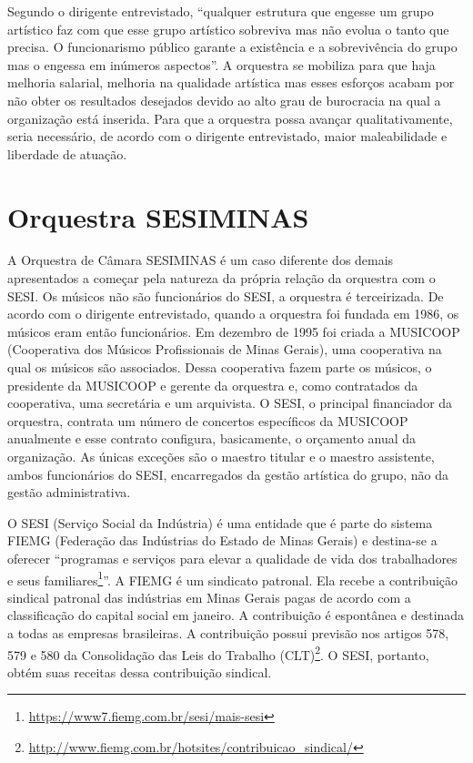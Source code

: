 \documentclass[a4paper, 12pt, openright, oneside, german, french, english, brazil]{abntex2}
\begin{document}
	Segundo o dirigente entrevistado, ``qualquer estrutura que engesse um grupo artístico faz com que esse grupo artístico sobreviva mas não evolua o tanto que precisa. O funcionarismo público garante a existência e a sobrevivência do grupo mas o engessa em inúmeros aspectos''. A orquestra se mobiliza para que haja melhoria salarial, melhoria na qualidade artística mas esses esforços acabam por não obter os resultados desejados devido ao alto grau de burocracia na qual a organização está inserida. Para que a orquestra possa avançar qualitativamente, seria necessário, de acordo com o dirigente entrevistado, maior maleabilidade e liberdade de atuação.
	
	
	
	
	
	\chapter{Orquestra SESIMINAS}
	
	A Orquestra de Câmara SESIMINAS é um caso diferente dos demais apresentados a começar pela natureza da própria relação da orquestra com o SESI. Os músicos não são funcionários do SESI, a orquestra é terceirizada. De acordo com o dirigente entrevistado, quando a orquestra foi fundada em 1986, os músicos eram então funcionários. Em dezembro de 1995 foi criada a MUSICOOP (Cooperativa dos Músicos Profissionais de Minas Gerais), uma cooperativa na qual os músicos são associados. Dessa cooperativa fazem parte os músicos, o presidente da MUSICOOP e gerente da orquestra e, como contratados da cooperativa, uma secretária e um arquivista. O SESI, o principal financiador da orquestra, contrata um número de concertos específicos da MUSICOOP anualmente e esse contrato configura, basicamente, o orçamento anual da organização. As únicas exceções são o maestro titular e o maestro assistente, ambos funcionários do SESI, encarregados da gestão artística do grupo, não da gestão administrativa.
	
	O SESI (Serviço Social da Indústria) é uma entidade que é parte do sistema FIEMG (Federação das Indústrias do Estado de Minas Gerais) e destina-se a oferecer ``programas e serviços para elevar a qualidade de vida dos trabalhadores e seus familiares\footnote{\url{https://www7.fiemg.com.br/sesi/mais-sesi}}''. A FIEMG é um sindicato patronal. Ela recebe a contribuição sindical patronal das indústrias em Minas Gerais pagas de acordo com a classificação do capital social em janeiro. A contribuição é espontânea e destinada a todas as empresas brasileiras. A contribuição possui previsão nos artigos 578, 579 e 580 da Consolidação das Leis do Trabalho (CLT)\footnote{\url{http://www.fiemg.com.br/hotsites/contribuicao_sindical/}}. O SESI, portanto, obtém suas receitas dessa contribuição sindical.
	
\end{document}

